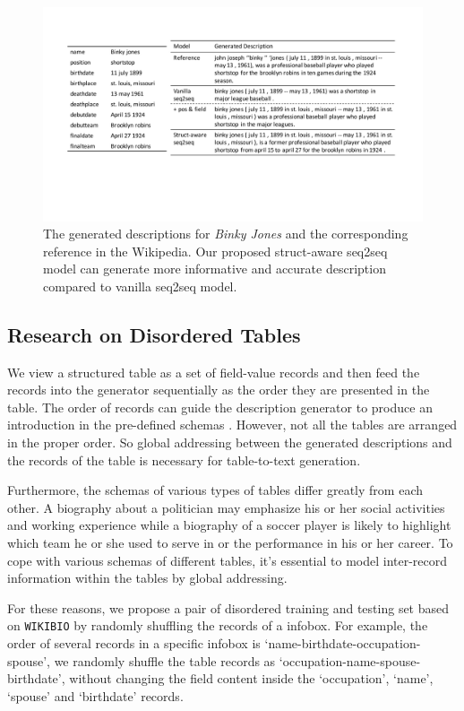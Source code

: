 \documentclass[letterpaper]{article} %
\begin{document}
\begin{figure}[t]
\centering
\includegraphics[width=0.95\linewidth]{pic33}
\caption{The generated descriptions  for \textit{Binky Jones} and the corresponding reference in the Wikipedia. Our proposed struct-aware seq2seq model can generate more informative and accurate description compared to vanilla seq2seq model.}\label{case-study}
\end{figure}

\subsection{Research on Disordered Tables}
We view a structured table as a set of field-value records and then feed the records into the generator sequentially as the order they are presented in the table.
The order of records can guide the description generator to produce an introduction in the pre-defined schemas \cite{vinyals2015order}.
However, not all the tables are arranged in the proper order. So global addressing between the generated descriptions and the records of the table is necessary for table-to-text generation.

Furthermore, the schemas of various types of tables differ greatly from each other. A biography about a politician may emphasize his or her social activities and working experience while a biography of a soccer player is likely to highlight which team he or she used to serve in or the performance in his or her career.
To cope with various schemas of different tables, it's essential to model inter-record information within the tables by global addressing.   
 
For these reasons, we propose a pair of disordered training and testing set based on \texttt{WIKIBIO} by randomly shuffling the records of a infobox. For example, the order of several records in a specific infobox is `name-birthdate-occupation-spouse', we randomly shuffle the table records as `occupation-name-spouse-birthdate', without changing the field content inside the `occupation', `name', `spouse' and `birthdate' records.
\end{document}
